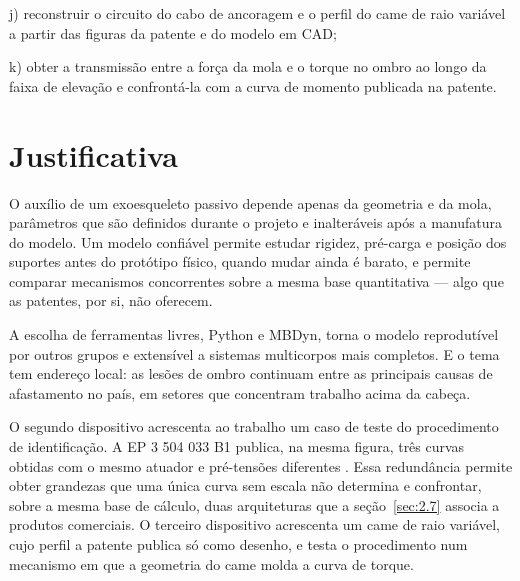 j) reconstruir o circuito do cabo de ancoragem e o perfil do came de raio variável a partir das figuras da patente e do modelo em CAD;

k) obter a transmissão entre a força da mola e o torque no ombro ao longo da faixa de elevação e confrontá-la com a curva de momento publicada na patente.

\section{Justificativa}\label{sec:1.2}

O auxílio de um exoesqueleto passivo depende apenas da geometria e da mola, parâmetros que são definidos durante o projeto e inalteráveis após a manufatura do modelo. Um modelo confiável permite estudar rigidez, pré-carga e posição dos suportes antes do protótipo físico, quando mudar ainda é barato, e permite comparar mecanismos concorrentes sobre a mesma base quantitativa — algo que as patentes, por si, não oferecem.

A escolha de ferramentas livres, Python e MBDyn, torna o modelo reprodutível por outros grupos e extensível a sistemas multicorpos mais completos. E o tema tem endereço local: as lesões de ombro continuam entre as principais causas de afastamento no país, em setores que concentram trabalho acima da cabeça.

O segundo dispositivo acrescenta ao trabalho um caso de teste do procedimento de identificação. A EP 3 504 033 B1 publica, na mesma figura, três curvas obtidas com o mesmo atuador e pré-tensões diferentes \cite{mizera2023}. Essa redundância permite obter grandezas que uma única curva sem escala não determina e confrontar, sobre a mesma base de cálculo, duas arquiteturas que a seção~\ref{sec:2.7} associa a produtos comerciais. O terceiro dispositivo acrescenta um came de raio variável, cujo perfil a patente publica só como desenho, e testa o procedimento num mecanismo em que a geometria do came molda a curva de torque.
